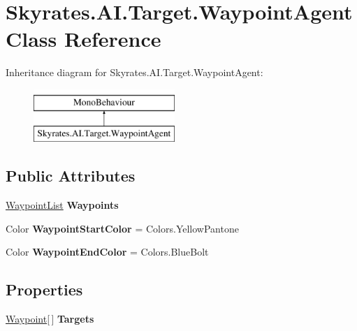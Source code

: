 \hypertarget{class_skyrates_1_1_a_i_1_1_target_1_1_waypoint_agent}{\section{Skyrates.\-A\-I.\-Target.\-Waypoint\-Agent Class Reference}
\label{class_skyrates_1_1_a_i_1_1_target_1_1_waypoint_agent}
}
Inheritance diagram for Skyrates.\-A\-I.\-Target.\-Waypoint\-Agent\-:\begin{figure}[H]
\begin{center}
\leavevmode
\includegraphics[height=2.000000cm]{class_skyrates_1_1_a_i_1_1_target_1_1_waypoint_agent}
\end{center}
\end{figure}
\subsection*{Public Attributes}
\begin{DoxyCompactItemize}
\item 
\hypertarget{class_skyrates_1_1_a_i_1_1_target_1_1_waypoint_agent_a132b9f2d609c1d694ddcefe00a56c1b3}{\hyperlink{class_skyrates_1_1_a_i_1_1_target_1_1_waypoint_list}{Waypoint\-List} {\bfseries Waypoints}}\label{class_skyrates_1_1_a_i_1_1_target_1_1_waypoint_agent_a132b9f2d609c1d694ddcefe00a56c1b3}

\item 
\hypertarget{class_skyrates_1_1_a_i_1_1_target_1_1_waypoint_agent_a81287b76ce8d64406d3b1ebae9ab4df7}{Color {\bfseries Waypoint\-Start\-Color} = Colors.\-Yellow\-Pantone}\label{class_skyrates_1_1_a_i_1_1_target_1_1_waypoint_agent_a81287b76ce8d64406d3b1ebae9ab4df7}

\item 
\hypertarget{class_skyrates_1_1_a_i_1_1_target_1_1_waypoint_agent_a84fb6c16a54ea0bd02e523b914a482eb}{Color {\bfseries Waypoint\-End\-Color} = Colors.\-Blue\-Bolt}\label{class_skyrates_1_1_a_i_1_1_target_1_1_waypoint_agent_a84fb6c16a54ea0bd02e523b914a482eb}

\end{DoxyCompactItemize}
\subsection*{Properties}
\begin{DoxyCompactItemize}
\item 
\hypertarget{class_skyrates_1_1_a_i_1_1_target_1_1_waypoint_agent_a938db2d0006c7f1af2582fa3651d6a8a}{\hyperlink{class_skyrates_1_1_a_i_1_1_target_1_1_waypoint}{Waypoint}\mbox{[}$\,$\mbox{]} {\bfseries Targets}}\label{class_skyrates_1_1_a_i_1_1_target_1_1_waypoint_agent_a938db2d0006c7f1af2582fa3651d6a8a}

\end{DoxyCompactItemize}


